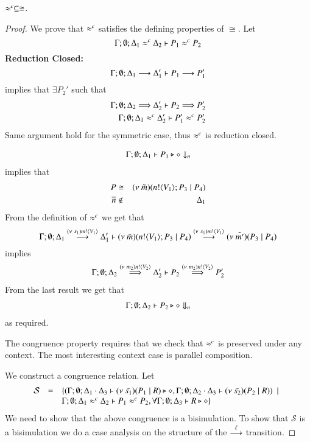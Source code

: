 \begin{lemma}
	\label{lem:wbc_is_cong}
	$\wbc \subseteq \cong$.
\end{lemma}


\begin{proof}
	\noi We prove that $\wbc$ satisfies the defining properties of $\cong$. Let
%
	\[
		\horel{\Gamma}{\Delta_1}{P_1}{\wbc}{\Delta_2}{P_2}
	\]
%
	{\bf Reduction Closed:}
%
	\[
		\horel{\Gamma}{\Delta_1}{P_1}{\by{}}{\Delta_1'}{P_1'}
	\]
%
	\noi implies that 
	$\exists P_2'$ such that 
%
	\begin{eqnarray*}
		\horel{\Gamma}{\Delta_2}{P_2}{\By{}}{\Delta_2'}{P_2'}\\
		\horel{\Gamma}{\Delta_1}{P_1'}{\wbc}{\Delta_2'}{P_2'}
	\end{eqnarray*}
%
	\noi Same argument hold for the symmetric case, thus $\wbc$ is reduction closed.

%
	\begin{eqnarray*}
		\Gamma; \emptyset; \Delta_1 \proves P_1 \hastype \Proc \barb{n}
	\end{eqnarray*}
%
	implies that
	\begin{eqnarray*}
		P &\cong& \newsp{\tilde{m}}{\bout{n}{V_1} P_3 \Par P_4}\\
		\dual{n} &\notin& \Delta_1
	\end{eqnarray*}
%
	\noi From the definition of $\wbc$ we get that
%
\[
	\horel	{\Gamma}{\Delta_1}{\newsp{\tilde{m}}{\bout{n}{V_1} P_3 \Par P_4}}
		{\by{\news{s_1} \bactout{m}{V_1}}}
		{\Delta_1'}
		{\newsp{\tilde{m'}}{P_3 \Par P_4}}
\]
%
	\noi implies
%
	\begin{eqnarray*}
		\horel{\Gamma}{\Delta_2}{P_2}{\By{\news{m_2} \bactout{n}{V_2}}}{\Delta_2'}{P_2'}\\
	\end{eqnarray*}
%
	\noi From the last result we get that
%
	\begin{eqnarray*}
		\Gamma; \emptyset; \Delta_2 \proves P_2 \hastype \Proc \Barb{n}
	\end{eqnarray*}
%
	\noi as required.


	\noi The congruence property requires that we check that $\wbc$
	is preserved under any context.
	The most interesting context case is parallel composition.

	\noi We construct a congruence relation. Let
	\[
	\begin{array}{rcl}
		\mathcal{S} &=&	\set{(\Gamma; \emptyset; \Delta_1 \cat \Delta_3 \proves \newsp{\tilde{s_1}}{P_1 \Par R} \hastype \Proc, \Gamma; \emptyset; \Delta_2 \cat \Delta_3 \proves \newsp{\tilde{s_2}}{P_2 \Par R}) \setbar \\
		& &	\Gamma;\emptyset;\Delta_1 \wbc \Delta_2 \proves P_1 \wbc P_2, \forall \Gamma; \emptyset; \Delta_3 \proves R \hastype \Proc}
	\end{array}
	\]
	\noi We need to show that the above congruence is a bisimulation.
	To show that $\mathcal{S}$ is a bisimulation we do a case analysis on the structure
	of the $\by{\ell}$ transition.


\end{proof}
